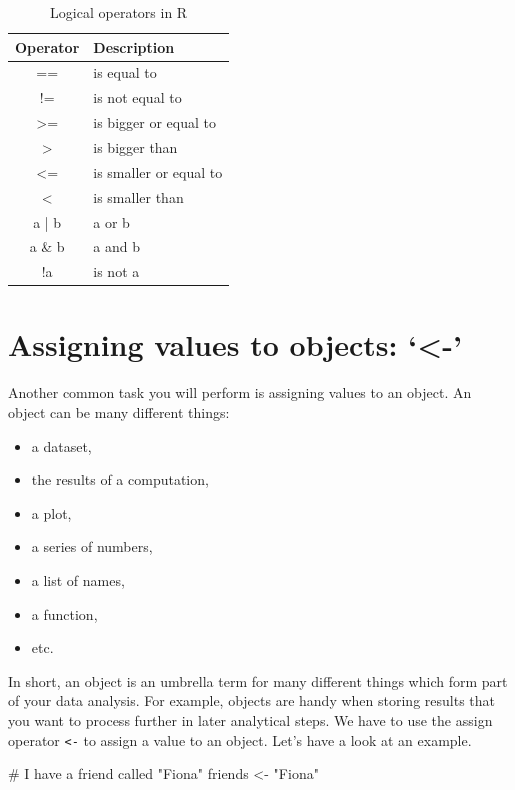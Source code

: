 \documentclass[
  letterpaper,
]{krantz}
\makeatletter
\newenvironment{Shaded}{\begin{snugshade}}{\end{snugshade}}
\newcommand{\CommentTok}[1]{\textcolor[rgb]{0.37,0.37,0.37}{#1}}
\newcommand{\NormalTok}[1]{\textcolor[rgb]{0.00,0.23,0.31}{#1}}
\newcommand{\OtherTok}[1]{\textcolor[rgb]{0.00,0.23,0.31}{#1}}
\newcommand{\StringTok}[1]{\textcolor[rgb]{0.13,0.47,0.30}{#1}}
\newenvironment{kframe}{%
\medskip{}
\setlength{\fboxsep}{.8em}
 \def\at@end@of@kframe{}%
 \ifinner\ifhmode%
  \def\at@end@of@kframe{\end{minipage}}%
  \begin{minipage}{\columnwidth}%
 \fi\fi%
 \def\FrameCommand##1{\hskip\@totalleftmargin \hskip-\fboxsep
 \colorbox{shadecolor}{##1}\hskip-\fboxsep
     \hskip-\linewidth \hskip-\@totalleftmargin \hskip\columnwidth}%
 \MakeFramed {\advance\hsize-\width
   \@totalleftmargin\z@ \linewidth\hsize
   \@setminipage}}%
 {\par\unskip\endMakeFramed%
 \at@end@of@kframe}
\renewenvironment{Shaded}{\begin{kframe}}{\end{kframe}}
\makeatother
\begin{document}
\begin{longtable}{cl}
\caption{Logical operators in R}\tabularnewline

\toprule
Operator & Description \\ 
\midrule\addlinespace[2.5pt]
== & is equal to \\ 
!= & is not equal to \\ 
>= & is bigger or equal to \\ 
> & is bigger than \\ 
<= & is smaller or equal to \\ 
< & is smaller than \\ 
a | b & a or b \\ 
a \& b & a and b \\ 
!a & is not a \\ 
\bottomrule
\end{longtable}

\section{Assigning values to objects:
`\textless-'}\label{sec-assigning-values-to-objects}

Another common task you will perform is assigning values to an object.
An object can be many different things:

\begin{itemize}
\item
  a dataset,
\item
  the results of a computation,
\item
  a plot,
\item
  a series of numbers,
\item
  a list of names,
\item
  a function,
\item
  etc.
\end{itemize}

In short, an object is an umbrella term for many different things which
form part of your data analysis. For example, objects are handy when
storing results that you want to process further in later analytical
steps. We have to use the assign operator \texttt{\textless{}-} to
assign a value to an object. Let's have a look at an example.

\begin{Shaded}
\begin{Highlighting}[]
\CommentTok{\# I have a friend called "Fiona"}
\NormalTok{friends }\OtherTok{\textless{}{-}} \StringTok{"Fiona"}
\end{Highlighting}
\end{Shaded}
\end{document}
